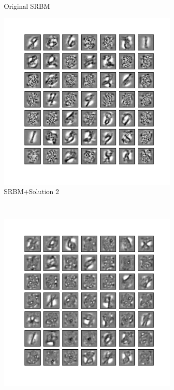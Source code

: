 \begin{figure}
\begin{subfigure}[t]{0.4\textwidth}
		\caption{Original SRBM}
	\end{subfigure}
	\begin{subfigure}[t]{0.4\textwidth}
		\includegraphics[width=\textwidth]{pics_sdlm/52_MNIST_SRBM_noise/2_60000_0.pdf}
		\caption{SRBM+Solution 2}
	\end{subfigure}	\\
	\begin{subfigure}[t]{0.4\textwidth}
		\includegraphics[width=\textwidth]{pics_sdlm/51_MNIST_SRBM_teach/2_60000_0.pdf}

\end{subfigure}
\end{figure}
